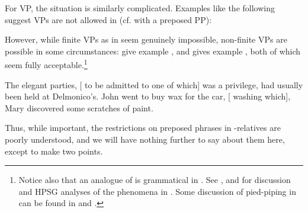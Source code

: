 \documentclass[output=paper
 	        ,biblatex
                ,babelshorthands
                ,newtxmath
                ,draftmode
                ,colorlinks, citecolor=brown
]{langscibook}
\begin{document}
For VP, the situation is similarly complicated. Examples like the following suggest VPs
are not allowed in  (cf.  with a preposed PP):
\begin{exe}\ex\begin{xlist}
    \label{x:rc-26}
    \label{x:rc-27}
    \label{x:rc-281}
    \label{x:rc-291}
  \end{xlist}
\end{exe}
However, while finite VPs as in  seem genuinely impossible, non-finite VPs
are possible in some circumstances: \cite[311]{NanniStillings78} give example
, and \cite[399]{Ishihara84} gives example , both of which
seem fully acceptable.\footnote{Notice also that an analogue of  is
  grammatical in . See \cite{deKuthy99a}, \cite{HN99a} and \cite{Mueller99a}
  for discussion and HPSG analyses of the phenomena in . Some discussion of
  pied-piping in  can be found in \cite{Godard92} and \cite{SG94}.}
\begin{exe}\ex\begin{xlist}
    \ex\label{x:rc-236} The elegant parties, [ to be admitted to one of which] was a privilege,
    had usually been held at Delmonico's. 
    \ex\label{x:rc-237} John went to buy wax for the car, [ washing which], Mary
    discovered some scratches of paint. 
  \end{xlist}
\end{exe}

Thus, while important, the restrictions on preposed phrases in -relatives are
poorly understood, and we will have nothing further to say about them here, except to make
two points.
\end{document}
